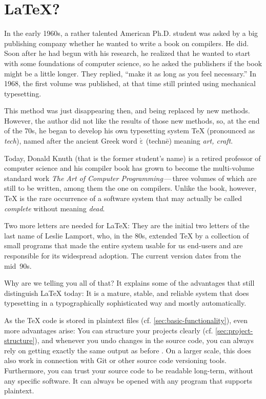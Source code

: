 \chapter{ \LaTeX?}
\label{sec:what-is-latex}

In the early 1960s, a rather talented American Ph.D. student was asked by a big publishing company whether he wanted to write a book on compilers.
He did.
Soon after he had begun with his research, he realized that he wanted to start with some foundations of computer science, so he asked the publishers if the book might be a little longer.
They replied, \enquote{make it as long as you feel necessary.}
In 1968, the first volume was published, at that time still printed using mechanical typesetting.

This method was just disappearing then, and being replaced by new methods.
However, the author did not like the results of those new methods, so,
at the end of the 70s, he began to develop his own typesetting system \TeX{}
(pronounced as \emph{tech}), named after the ancient Greek word \texttau$\mathrm{\acute{\varepsilon}}$\textchi\textnu\texteta{} (technē) meaning \emph{art, craft}.

Today, Donald Knuth (that is the former student’s name) is a retired professor of computer science and his compiler book has grown to become the multi-volume standard work \emph{The Art of Computer Programming}\,—\,three volumes of which are still to be written, among them the one on compilers.
Unlike the book, however, \TeX{} is the rare occurrence of a software system that may actually be called \emph{complete} without meaning \emph{dead}.

Two more letters are needed for \LaTeX:
They are the initial two letters of the last name of Leslie Lamport, who, in the 80s, extended \TeX{} by a collection of small programs that made the entire system usable for us end-users and are responsible for its widespread adoption.
The current version dates from the mid~90s.

Why are we telling you all of that?
It explains some of the advantages that still distinguish \LaTeX{} today:
It is a mature, stable, and reliable system
that does typesetting in a typographically sophisticated way and mostly automatically.

As the \TeX{} code is stored in plaintext files (cf. \cref{sec:basic-functionality}),
even more advantages arise:
You can structure your projects clearly (cf. \cref{sec:project-structure}),
and whenever you undo changes in the source code, you can always rely on getting exactly the same output as before
.
On a larger scale, this does also work in connection with Git or other source code versioning tools.
Furthermore, you can trust your source code to be readable long-term, without any specific software.
It can always be opened with any program that supports plaintext.

